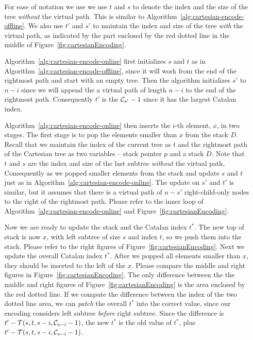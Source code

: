 For ease of notation we use we use $t$ and $s$ to denote the index and
the size of the tree {\em without} the virtual path.  This is similar
to Algorithm~\ref{alg:cartesian-encode-offline}.  We also use $t'$ and
$s'$ to maintain the index and size of the tree {\em with} the virtual
path, as indicated by the part enclosed by the red dotted line in the
middle of Figure~\ref{fig:cartesianEncoding}.

Algorithm~\ref{alg:cartesian-encode-online} first initializes $s$ and
$t$ as in Algorithm~\ref{alg:cartesian-encode-offline}, since it will
work from the end of the rightmost path and start with an empty tree.
Then the algorithm initializes $s'$ to $n - i$ since we will append
the a virtual path of length $n - i$ to the end of the rightmost path.
Consequently $t'$ is the ${\cal C}_{s'} - 1$ since it has the largest
Catalan index.

Algorithm~\ref{alg:cartesian-encode-online} then inserts the $i$-th
element, $x$, in two stages.  The first stage is to pop the elements
smaller than $x$ from the stack $D$.  Recall that we maintain the
index of the current tree as $t$ and the rightmost path of the
Cartesian tree as two variables -- stack pointer $p$ and a stack $D$.
Note that $t$ and $s$ are the index and size of the last subtree {\em
  without} the virtual path.  Consequently as we popped smaller
elements from the stack and update $s$ and $t$ just as in
Algorithm~\ref{alg:cartesian-encode-online}.  The update on $s'$ and
$t'$ is similar, but it assumes that there is a virtual path of $n -
s'$ right-child-only nodes to the right of the rightmost path.  Please
refer to the inner loop of Algorithm~\ref{alg:cartesian-encode-online}
and Figure~\ref{fig:cartesianEncoding}.



Now we are ready to update the stack and the Catalan index $t^*$.  The
new top of stack is now $x$, with left subtree of size $s$ and index
$t$, so we push them into the stack.  Please refer to the right
figures of Figure~\ref{fig:cartesianEncoding}.  Next we update the
overall Catalan index $t^*$.  After we popped all elements smaller
than $x$, they should be inserted to the left of the $x$.  Please
compare the middle and right figures in
Figure~\ref{fig:cartesianEncoding}.  The only difference between the
the middle and right figures of Figure~\ref{fig:cartesianEncoding} is
the area enclosed by the red dotted line.  If we compute the
difference between the index of the two dotted line area, we can {\em
  patch} the overall $t^*$ into the correct value, since our encoding
considers left subtree {\em before} right subtree.  Since the
difference is $t' - {\cal T}(s, t, s - i, {\cal C}_{s-i} - 1)$, the
new $t^*$ is the old value of $t^*$, plus $t' - {\cal T}(s, t, s - i,
{\cal C}_{s-i} - 1)$.

